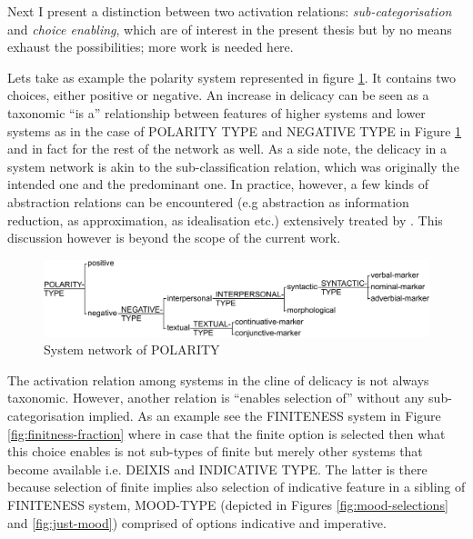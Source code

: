     Next I present a distinction between two activation relations: \textit{sub-categorisation} and \textit{choice enabling}, which are of interest in the present thesis but by no means exhaust the possibilities; more work is needed here.
    
    Lets take as example the polarity system represented in figure \ref{fig:polarity}. It contains two choices, either positive or negative. 
    An increase in delicacy can be seen as a taxonomic ``is a'' relationship between features of higher systems and lower systems as in the case of POLARITY TYPE and NEGATIVE TYPE in Figure \ref{fig:polarity} and in fact for the rest of the network as well. 
    As a side note, the delicacy in a system network is akin to the sub-classification relation, which was originally the intended one and the predominant one. In practice, however, a few kinds of abstraction relations can be encountered (e.g abstraction as information reduction, as approximation, as idealisation etc.) extensively treated by \citet{Saitta2013}. This discussion however is beyond the scope of the current work.
    
    \begin{figure}[!ht]
        \centering
        \includegraphics[width=\textwidth]{Figures/SFL-grammar/polarity-system.pdf}
        \caption{System network of POLARITY}
        \label{fig:polarity}
    \end{figure}
    
    The activation relation among systems in the cline of delicacy is not always taxonomic. However, another relation is ``enables selection of'' without any sub-categorisation implied. As an example see the FINITENESS system in Figure \ref{fig:finitness-fraction} where in case that the finite option is selected then what this choice enables is not sub-types of finite but merely other systems that become available i.e. DEIXIS and INDICATIVE TYPE. The latter is there because selection of finite implies also selection of indicative feature in a sibling of FINITENESS system, MOOD-TYPE (depicted in Figures \ref{fig:mood-selections} and \ref{fig:just-mood}) comprised of options indicative and imperative.
    

